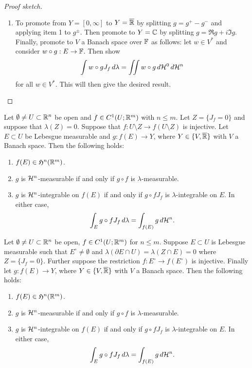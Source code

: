 \documentclass[a4paper]{article}
\begin{document}
\begin{proof}[Proof sketch]
\begin{enumerate}
    \item To promote from $Y = [0, \infty]$ to $Y = \overline{\mathbb{R}}$ by splitting
          $g = g^+ - g^-$ and applying item 1 to $g^{\pm}$. Then promote
          to $Y = \mathbb{C}$ by splitting $g = \Re g + i \Im g$. Finally, promote
          to $V$ a Banach space over $\mathbb{F}$ as follows: let $w \in V^*$ and
          consider $w \circ g : E \to \mathbb{F}$. Then show
          \[
            \int w \circ g J_f \, d \lambda = \iint w \circ g \, d \mathcal{H}^0 \, d \mathcal{H}^n
          \]
          for all $w \in V^*$. This will then give the desired result.

  \end{enumerate}
\end{proof}

\begin{thm}
  Let $\emptyset \neq U \subset \mathbb{R}^n$ be open and $f \in C^1
    (U; \mathbb{R}^m)$ with $n \leq m$. Let $Z = \{J_f = 0\}$ and suppose
  that $\lambda (Z) = 0$. Suppose that $f : U \setminus Z
    \to f(U \setminus Z)$ is injective. Let $E \subset U$ be
  Lebesgue measurable and $g : f(E) \to Y$, where $Y
    \in \{V, \overline{\mathbb{R}}\}$ with $V$ a Banach space. Then the
  following holds:
  \begin{enumerate}
    \item $f(E) \in \mathfrak{H}^n(\mathbb{R}^m)$.
    \item $g$ is $\mathcal{H}^n$-measurable if and only if
          $g \circ f$ is $\lambda$-measurable.
    \item $g$ is $\mathcal{H}^n$-integrable on $f(E)$ if and only
          if $g \circ f J_f$ is $\lambda$-integrable on $E$.
          In either case,
          \[
            \int_E g \circ f J_f \, d \lambda = \int_{f(E)}
            g \, d \mathcal{H}^n.
          \]
  \end{enumerate}
\end{thm}

\begin{thm}
  Let $\emptyset \neq U \subset \mathbb{R}^n$ be open, $f \in C^1
    (U ; \mathbb{R}^m)$ for $n \leq m$. Suppose $E \subset U$ is Lebesgue
  measurable such that $E^\circ \neq \emptyset$ and
  $\lambda (\partial E \cap U) = \lambda (Z \cap E) = 0$
  where $Z = \{J_f = 0\}$. Further suppose
  the restriction $f : E^\circ \to f(E^\circ)$ is injective.
  Finally let $g : f(E) \to Y$, where $Y \in \{V, \overline{\mathbb{R}}\}$
  with $V$ a Banach space. Then the following holds:
  \begin{enumerate}
    \item $f(E) \in \mathfrak{H}^n (\mathbb{R}^m)$.
    \item $g$ is $\mathcal{H}^n$-measurable if and only if
          $g \circ f$ is $\lambda$-measurable.
    \item $g$ is $\mathcal{H}^n$-integrable on $f(E)$
          if and only if $g \circ f J_f$ is $\lambda$-integrable
          on $E$. In either case,
          \[
            \int_E g \circ f J_f  \, d \lambda
            = \int_{f(E)} g \, d \mathcal{H}^n.
          \]
  \end{enumerate}
\end{thm}
\end{document}
